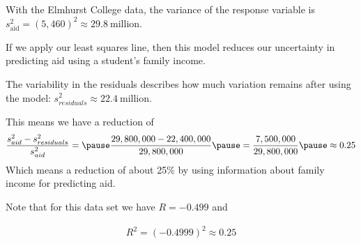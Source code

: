 \documentclass{beamer}
\begin{document}
\begin{frame}
  \begin{example}
    With the Elmhurst College data, the variance of the response variable is $s_{\text{aid}}^2={(5,460)}^2\approx 29.8~\text{million}$.\pause

    \vspace{1mm}
    If we apply our least squares line, then this model reduces our uncertainty in predicting aid using a student's family income.\pause

    \vspace{1mm}
    The variability in the residuals describes how much variation remains after using the model: $s_{residuals}^2\approx 22.4~\text{million}$.\pause

    \vspace{1mm}
    This means we have a reduction of
    \begin{equation*}
      \begin{aligned}
        \dfrac{s_{aid}^2 - s_{residuals}^2}{s_{aid}^2} =\pause
        \dfrac{29,800,000 - 22,400,000}{29,800,000}\pause
        = \dfrac{7,500,000}{29,800,000}\pause
        \approx 0.25
      \end{aligned}
    \end{equation*}\pause
    Which means a reduction of about 25\% by using information about family income for predicting aid.\pause

    \vspace{1mm}
    Note that for this data set we have $R=-0.499$ and

    \vspace{-4mm}
    \begin{equation*}
      \begin{aligned}
        R^2 = {(-0.4999)}^2 \approx 0.25
      \end{aligned}
    \end{equation*}
  \end{example}
\end{frame}
\end{document}
